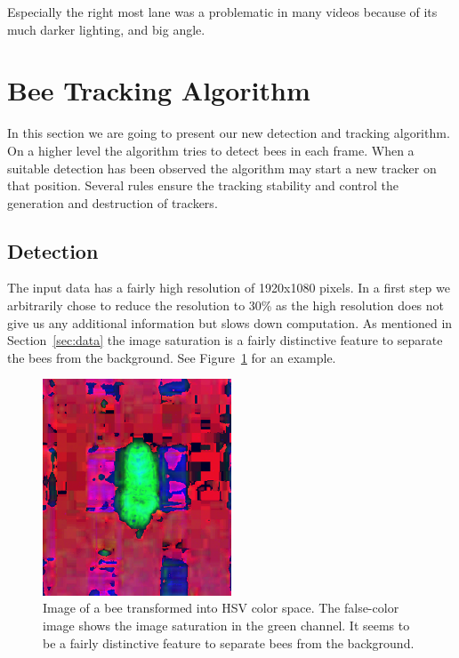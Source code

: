 \documentclass[10pt,a4paper]{article}
\begin{document}
Especially the right most lane was a problematic in many videos because of its much darker lighting, and big angle.

\section{Bee Tracking Algorithm}
\label{sec:method}

In this section we are going to present our new detection and tracking algorithm. On a higher level the algorithm tries to detect bees in each frame. When a suitable detection has been observed the algorithm may start a new tracker on that position. Several rules ensure the tracking stability and control the generation and destruction of trackers. 

\subsection{Detection}
The input data has a fairly high resolution of 1920x1080 pixels. In a first step we arbitrarily chose to reduce the resolution to 30\% as the high resolution does not give us any additional information but slows down computation. As mentioned in Section~\ref{sec:data} the image saturation is a fairly distinctive feature to separate the bees from the background. See Figure~\ref{fig:hsvbee} for an example.

\begin{figure}
\label{fig:hsvbee}
\centering
\includegraphics[width=0.5\textwidth]{hsvbee}
\caption{Image of a bee transformed into HSV color space. The false-color image shows the image saturation in the green channel. It seems to be a fairly distinctive feature to separate bees from the background.}
\end{figure}
\end{document}
